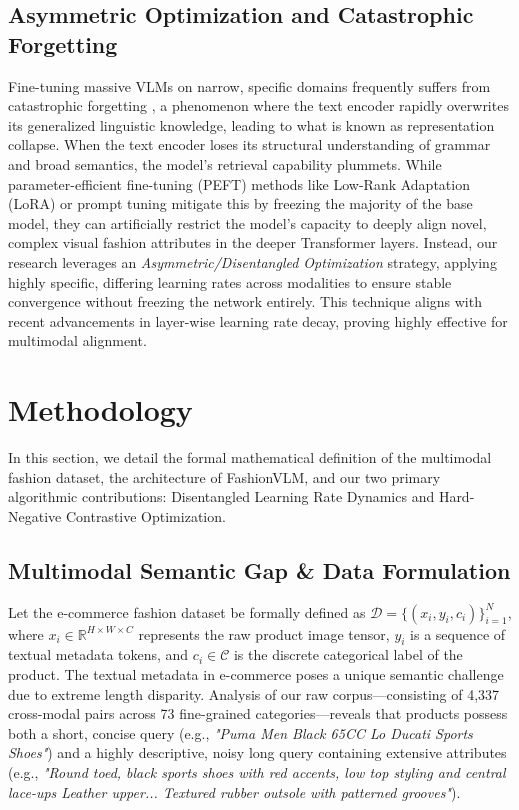 \documentclass[conference]{IEEEtran}
\begin{document}
\subsection{Asymmetric Optimization and Catastrophic Forgetting}
Fine-tuning massive VLMs on narrow, specific domains frequently suffers from catastrophic forgetting \cite{kirk2021understanding}, a phenomenon where the text encoder rapidly overwrites its generalized linguistic knowledge, leading to what is known as representation collapse. When the text encoder loses its structural understanding of grammar and broad semantics, the model's retrieval capability plummets. While parameter-efficient fine-tuning (PEFT) methods like Low-Rank Adaptation (LoRA) or prompt tuning mitigate this by freezing the majority of the base model, they can artificially restrict the model's capacity to deeply align novel, complex visual fashion attributes in the deeper Transformer layers. Instead, our research leverages an \textit{Asymmetric/Disentangled Optimization} strategy, applying highly specific, differing learning rates across modalities to ensure stable convergence without freezing the network entirely. This technique aligns with recent advancements in layer-wise learning rate decay, proving highly effective for multimodal alignment.

\section{Methodology}

In this section, we detail the formal mathematical definition of the multimodal fashion dataset, the architecture of FashionVLM, and our two primary algorithmic contributions: Disentangled Learning Rate Dynamics and Hard-Negative Contrastive Optimization.

\subsection{Multimodal Semantic Gap \& Data Formulation}
Let the e-commerce fashion dataset be formally defined as $\mathcal{D} = \{(x_i, y_i, c_i)\}_{i=1}^N$, where $x_i \in \mathbb{R}^{H \times W \times C}$ represents the raw product image tensor, $y_i$ is a sequence of textual metadata tokens, and $c_i \in \mathcal{C}$ is the discrete categorical label of the product. The textual metadata in e-commerce poses a unique semantic challenge due to extreme length disparity. Analysis of our raw corpus---consisting of 4,337 cross-modal pairs across 73 fine-grained categories---reveals that products possess both a short, concise query (e.g., \textit{"Puma Men Black 65CC Lo Ducati Sports Shoes"}) and a highly descriptive, noisy long query containing extensive attributes (e.g., \textit{"Round toed, black sports shoes with red accents, low top styling and central lace-ups Leather upper... Textured rubber outsole with patterned grooves"}).
\end{document}
